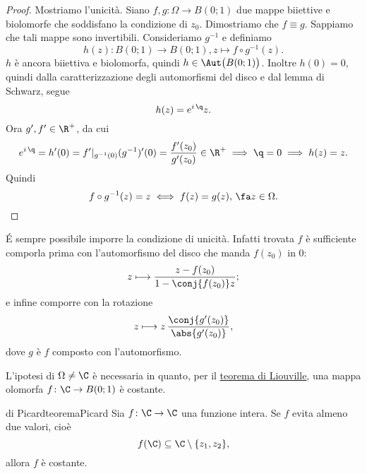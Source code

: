 \begin{proof}
	Mostriamo l'unicità. Siano \(f,g\colon \Omega \to B(0;1)\) due mappe biiettive e biolomorfe che soddisfano la condizione di \(z_0\). Dimostriamo che \(f\equiv g\).
	Sappiamo che tali mappe sono invertibili. Consideriamo \(g^{-1}\) e definiamo
	\[
		h(z)\colon B(0;1) \longrightarrow B(0;1), z \longmapsto f\circ g^{-1}(z).
	\]
	\(h\) è ancora biiettiva e biolomorfa, quindi \(h\in \Aut\big(B(0;1)\big)\).
	Inoltre \(h(0)=0\), quindi dalla caratterizzazione degli automorfismi del disco e dal lemma di Schwarz, segue
	\[
		h(z) = e^{i\,\q}z.
	\]
	Ora \(g',f'\in \R^+\), da cui
	\[
		e^{i\,\q} = h'(0) = f'|_{g^{-1}(0)}(g^{-1})'(0) = \frac{f'(z_0)}{g'(z_0)} \in \R^+ \implies \q = 0 \implies h(z) = z.
	\]
	Quindi
	\[
		f\circ g^{-1}(z) = z \iff f(z) = g(z),\,\fa z\in \Omega.
	\]
\end{proof}

\begin{oss}
	\'E sempre possibile imporre la condizione di unicità. Infatti trovata \(f\) è sufficiente comporla prima con l'automorfismo del disco che manda \(f(z_0)\) in \(0\):
	\[
		z \longmapsto \frac{z-f(z_0)}{1-\conj{f(z_0)}z};
	\]
	e infine comporre con la rotazione
	\[
		z \longmapsto z\,\frac{\conj{g'(z_0)}}{\abs{g'(z_0)}},
	\]
	dove \(g\) è \(f\) composto con l'automorfismo.
\end{oss}

\begin{oss}
	L'ipotesi di \(\Omega \neq \C\) è necessaria in quanto, per il \hyperref[th:teoremaLiouville]{teorema di Liouville}, una mappa olomorfa \(f\colon \C \to B(0;1)\) è costante.
\end{oss}

\begin{teor}{di Picard}{teoremaPicard}
	Sia \(f\colon \C \to \C\) una funzione intera.
	Se \(f\) evita almeno due valori, cioè
	\[
		f(\C) \subseteq \C\setminus\{z_1,z_2\},
	\]
	allora \(f\) è costante.
\end{teor}

